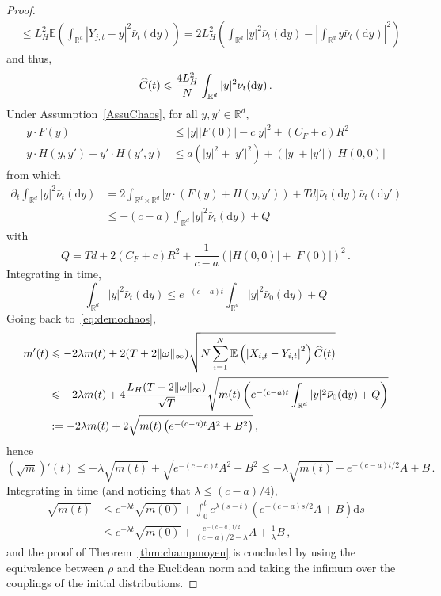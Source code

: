 \documentclass[10pt]{amsart}
\theoremstyle{definition}\newtheorem{defi}[theo]{Definition}\newtheorem{rema}[theo]{Remark}\newtheorem{exam}[theo]{Example}\newtheorem{exem}[theo]{Example}\newtheorem{nota}[theo]{Notation}
\newcommand{\R}{\mathbb R}
\newcommand{\bbE}{\mathbb E}
\newcommand{\dd}{\mathrm{d}}
\newcommand{\1}{\mathbbm{1}}
\newcommand{\nv}[1]{#1}
\let\oldhat\hat
\renewcommand*{\hat}[1]{\mathchoice{\widehat{#1}}{\widehat{#1}}{\oldhat{#1}}{\oldhat{#1}}}
\begin{document}
\begin{proof}
\begin{align*}
& \leqslant L_H^2 \bbE \left( \int_{\R^d} \left| Y_{j,t}-y \right|^2 \bar \nu_t(\dd y) \right) = 2 L_H^2 \left( \int_{\R^d} |y|^2 \nv{\bar \nu}_t(\dd y) - \left|\int_{\R^d} y \nv{\bar \nu}_t(\dd y)\right|^2\right)
\end{align*}
and thus,
\[
\hat C(t) \leqslant \frac{4L_H^2}{N} \int_{\R^d} |y|^2 \nv{\bar \nu}_t(\dd y)\,.
\]
Under Assumption~\ref{AssuChaos}, for all $y,y'\in\R^d$,
\begin{align*}
y\cdot F(y)& \leqslant |y||F(0)| - c|y|^2 +(C_F+c)R^2 \\
y\cdot H(y,y') + y' \cdot H(y',y) &\leqslant a \left( |y|^2+|y'|^2\right) + \left(|y|+|y'|\right) |H(0,0)|
\end{align*}
from which
\begin{align*}
\partial_t \int_{\R^d} |y|^2 \nv{\bar \nu}_t(\dd y) & = 2\int_{\R^d\times\R^d} \big[ y \cdot \left( F(y) + H(y,y') \right) + T d \big] \nv{\bar \nu}_t(\dd y)\nv{\bar \nu} _t(\dd y')\\
& \leqslant - (c-a) \int_{\R^d} |y|^2 \nv{\bar \nu}_t(\dd y) +Q
\end{align*}
with
\[
Q = Td + 2(C_F+c)R^2 + \frac{1}{c-a}\left( |H(0,0)|+|F(0)|\right)^2\,.
\]
Integrating in time,
\[
\int_{\R^d} |y|^2 \nv{\bar \nu}_t(\dd y) \leqslant e^{-(c-a)t} \int_{\R^d} |y|^2 \nv{\bar \nu}_0(\dd y) + Q
\]
Going back to~\eqref{eq:demochaos},
\begin{align*}
m'(t) &\leqslant -2\lambda m(t) + 2 (T+2\|\nv{\omega}\|_\infty) \sqrt{ N\sum_{i=1}^N \bbE \left( \left|X_{i,t} - Y_{i,t}\right|^2\right) \hat C(t) }\\
& \leqslant -2\lambda m(t) + 4 \frac{L_H(T+2\|\nv{\omega}\|_\infty)}{\sqrt T} \sqrt{m(t)\left( e^{-(c-a)t} \int_{\R^d} |y|^2 \nv{\bar \nu}_0(\dd y) + Q\right) }\\
& := -2\lambda m(t) + 2\sqrt{m(t) \left( e^{-(c-a)t}A^2+B^2\right) }\,,
\end{align*}
hence
\[
\left(\sqrt{m}\right)'(t) \leqslant -\lambda \sqrt{m(t)} + \sqrt{ e^{-(c-a)t}A^2+B^2 } \leqslant -\lambda \sqrt{m(t)} + e^{-(c-a)t/2}A+B \,.
\]
Integrating in time (and noticing that $\lambda \leqslant (c-a)/4$),
\begin{align*}
\sqrt{m(t)} &\leqslant e^{-\lambda t} \sqrt{m(0)} + \int_0^t e^{\lambda(s-t)}\left( e^{-(c-a)s/2} A+ B\right)\dd s \\
&\leqslant e^{-\lambda t} \sqrt{m(0)} + \frac{e^{-(c-a)t/2}}{(c-a)/2-\lambda}A + \frac{1}{\lambda} B \,,
\end{align*}
and the proof of Theorem~\ref{thm:champmoyen} is concluded by using the equivalence between $\rho$ and the Euclidean norm and taking the infimum over the couplings of the initial distributions.
\end{proof}
\end{document}
